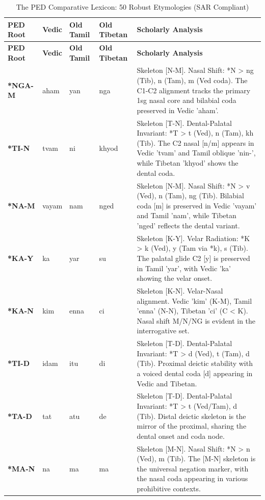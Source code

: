 \begin{longtable}{p{} p{} p{} p{} p{}}
\caption{The PED Comparative Lexicon: 50 Robust Etymologies (SAR Compliant)} \\
\toprule
\textbf{PED Root} & \textbf{Vedic} & \textbf{Old Tamil} & \textbf{Old Tibetan} & \textbf{Scholarly Analysis} \\
\midrule
\endfirsthead
\toprule
\textbf{PED Root} & \textbf{Vedic} & \textbf{Old Tamil} & \textbf{Old Tibetan} & \textbf{Scholarly Analysis} \\
\midrule
\endhead
\bottomrule
\endfoot
\textbf{*NGA-M} & aham & yan & nga & \small Skeleton [N-M]. Nasal Shift: *N > ng (Tib), n (Tam), m (Ved coda). The C1-C2 alignment tracks the primary 1sg nasal core and bilabial coda preserved in Vedic 'aham'. \\ 
\addlinespace[10pt]
\textbf{*TI-N} & tvam & ni & khyod & \small Skeleton [T-N]. Dental-Palatal Invariant: *T > t (Ved), n (Tam), kh (Tib). The C2 nasal [n/m] appears in Vedic 'tvam' and Tamil oblique 'nin-', while Tibetan 'khyod' shows the dental coda. \\ 
\addlinespace[10pt]
\textbf{*NA-M} & vayam & nam & nged & \small Skeleton [N-M]. Nasal Shift: *N > v (Ved), n (Tam), ng (Tib). Bilabial coda [m] is preserved in Vedic 'vayam' and Tamil 'nam', while Tibetan 'nged' reflects the dental variant. \\ 
\addlinespace[10pt]
\textbf{*KA-Y} & ka & yar & su & \small Skeleton [K-Y]. Velar Radiation: *K > k (Ved), y (Tam via *k), s (Tib). The palatal glide C2 [y] is preserved in Tamil 'yar', with Vedic 'ka' showing the velar onset. \\ 
\addlinespace[10pt]
\textbf{*KA-N} & kim & enna & ci & \small Skeleton [K-N]. Velar-Nasal alignment. Vedic 'kim' (K-M), Tamil 'enna' (N-N), Tibetan 'ci' (C < K). Nasal shift M/N/NG is evident in the interrogative set. \\ 
\addlinespace[10pt]
\textbf{*TI-D} & idam & itu & di & \small Skeleton [T-D]. Dental-Palatal Invariant: *T > d (Ved), t (Tam), d (Tib). Proximal deictic stability with a voiced dental coda [d] appearing in Vedic and Tibetan. \\ 
\addlinespace[10pt]
\textbf{*TA-D} & tat & atu & de & \small Skeleton [T-D]. Dental-Palatal Invariant: *T > t (Ved/Tam), d (Tib). Distal deictic skeleton is the mirror of the proximal, sharing the dental onset and coda node. \\ 
\addlinespace[10pt]
\textbf{*MA-N} & na & ma & ma & \small Skeleton [M-N]. Nasal Shift: *N > n (Ved), m (Tib). The [M-N] skeleton is the universal negation marker, with the nasal coda appearing in various prohibitive contexts. \\ 

\end{longtable}
